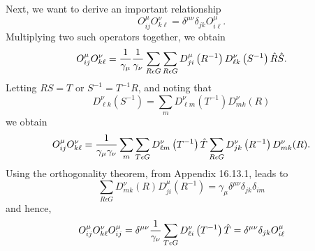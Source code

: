 Next, we want to derive an important relationship
\begin{equation}
O^{\mu}_{ij} O^{\nu}_{k\ell} = \delta^{\mu \nu} \delta_{jk} 
O^{\mu}_{i\ell}.
\label{chap16-eqno58}
\end{equation}
Multiplying two such operators together, we obtain
\begin{equation}
O^{\mu}_{ij} O^{\nu}_{k\ell} = {1 \over \gamma_{\mu}} {1 \over 
\gamma_{\nu}} \sum_{R \epsilon G} \sum_{R \epsilon G}  D^{\mu}_{ji} 
\left( R^{-1} \right) D^{\nu}_{\ell k} \left( S^{-1} \right) 
{\hat{R}} {\hat{S}}.
\end{equation}
Letting $RS = T$ or $S^{-1} = T^{-1}R$, and noting that
\begin{equation}
D^{\nu}_{\ell k} \left( S^{-1} \right) = \sum_m D^{\nu}_{\ell m} 
\left( T^{-1} \right) D^{\nu}_{mk} (R)
\end{equation}
we obtain
\begin{equation}
O^{\mu}_{ij} O^{\nu}_{k\ell} = {1 \over \gamma_{\mu} \gamma_{\nu}} \sum_m
\sum_{T \epsilon G} D^{\nu}_{\ell m} \left( T^{-1} \right) {\hat{T}} 
\sum_{R \epsilon G} D^{\nu}_{j k} \left( R^{-1} \right) D^{\nu}_{mk}(R).
\end{equation}
Using the orthogonality theorem, from Appendix 16.13.1, leads to
\begin{equation}
\sum_{R \epsilon G} D^{\nu}_{m k} (R) D^{\mu}_{ji} \left( R^{-1} 
\right) = \gamma_{\mu} \delta^{\mu \nu} \delta_{jk} \delta_{im}
\end{equation}
and hence,
\begin{equation}
O^{\mu}_{ij} O^{\nu}_{k\ell}  O^{\mu}_{ij} = \delta^{\mu \nu} {1 
\over \gamma_{\nu}} \sum_{T \epsilon G}
D^{\nu}_{\ell i} \left( T^{-1} \right) {\hat{T}} = \delta^{\mu \nu} 
\delta_{jk} O^{\mu}_{i \ell}
\end{equation}

